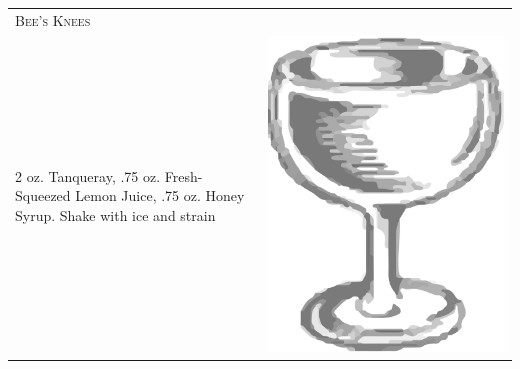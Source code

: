 \documentclass{article}
\begin{document}
\begin{tabular}{p{2in} p{0.5in}}
	\multicolumn{2}{p{3in}}{\centering\Huge\textsc{Bee's Knees}}\\ 
	  \vspace{-0.1in}2 oz. Tanqueray, .75 oz. Fresh-Squeezed Lemon Juice, .75 oz. Honey Syrup. Shake with ice and strain&
	  \vspace{-0.1in} \includegraphics{coupe.png}
\end{tabular}\\
\end{document}

